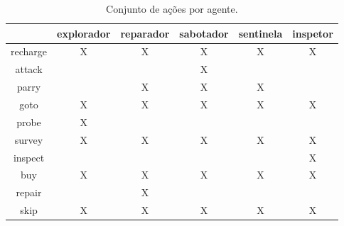 \documentclass{llncs}
\begin{document}
\begin{table}[h]
\centering
\begin{tabular}{|c|c|c|c|c|c|}
	\hline
	         & explorador & reparador & sabotador & sentinela & inspetor \\ \hline
	recharge &      X      &     X      &     X      &    X       & X \\ \hline
	 attack  &            &           &     X      &           &  \\ \hline
	 parry   &            &     X      &    X       &    X       &  \\ \hline
	  goto   &     X       &     X      &   X        &    X       & X  \\ \hline
	 probe   &     X       &           &           &           &  \\ \hline
	 survey  &      X      &     X      &    X       &    X       & X \\ \hline
	inspect  &            &           &           &           &  X\\ \hline
	  buy    &     X       &     X      &     X      &   X        & X \\ \hline
	 repair  &            &      X     &           &           &  \\ \hline
	  skip   &    X        &     X      &    X       &   X        & X \\ \hline
\end{tabular}
\caption{Conjunto de ações por agente.}
\label{table:tab1}
\end{table}
\end{document}
